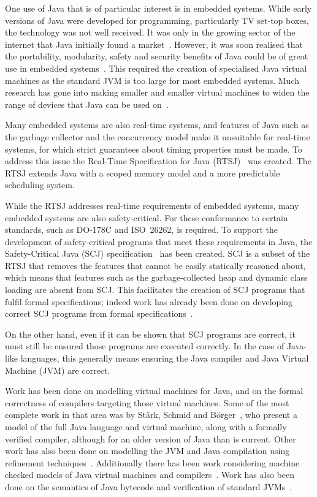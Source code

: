 \documentclass[a4paper,10pt]{report}
\begin{document}
One use of Java that is of particular interest is in embedded systems.
While early versions of Java were developed for programming,
particularly TV set-top boxes, the technology was not well received.
It was only in the growing sector of the internet that Java initially
found a market~\cite{horstmann2002}.
However, it was soon realised that the portability, modularity, safety
and security benefits of Java could be of great use in embedded
systems~\cite{mulchandani1998}.
This required the creation of specialised Java virtual machines as the
standard JVM is too large for most embedded systems.
Much research has gone into making smaller and smaller virtual
machines to widen the range of devices that Java can be used
on~\cite{caska2011,thomm2010}.

Many embedded systems are also real-time systems, and features of Java
such as the garbage collector and the concurrency model make it
unsuitable for real-time systems, for which strict guarantees about
timing properties must be made.
To address this issue the Real-Time Specification for Java
(RTSJ)~\cite{gosling2000} was created.
The RTSJ extends Java with a scoped memory model and a more
predictable scheduling system.

While the RTSJ addresses real-time requirements of embedded systems,
many embedded systems are also safety-critical.
For these conformance to certain standards, such as \mbox{DO-178C} and
ISO~26262, is required.
To support the development of safety-critical programs that meet these
requirements in Java, the Safety-Critical Java (SCJ)
specification~\cite{locke2013} has been created.
SCJ is a subset of the RTSJ that removes the features that cannot be
easily statically reasoned about, which means that features such as
the garbage-collected heap and dynamic class loading are absent from
SCJ.
This facilitates the creation of SCJ programs that fulfil formal
specifications; indeed work has already been done on developing
correct SCJ programs from formal specifications~\cite{cavalcanti2011,
  cavalcanti2013}.

On the other hand, even if it can be shown that SCJ programs are
correct, it must still be ensured those programs are executed
correctly.
In the case of Java-like languages, this generally means ensuring the
Java compiler and Java Virtual Machine (JVM) are correct.

Work has been done on modelling virtual machines for Java, and on the
formal correctness of compilers targeting those virtual machines.
Some of the most complete work in that area was by St\"{a}rk, Schmid
and B\"{o}rger~\cite{stark2001}, who present a model of the full Java
language and virtual machine, along with a formally verified compiler,
although for an older version of Java than is current.
Other work has also been done on modelling the JVM and Java
compilation using refinement techniques~\cite{duran2010}.
Additionally there has been work considering machine checked models of
Java virtual machines and compilers~\cite{lochbihler2012, nipkow2000,
  strecker2002}.
Work has also been done on the semantics of Java bytecode and
verification of standard JVMs~\cite{bertelsen2000, jones1998}.
\end{document}

